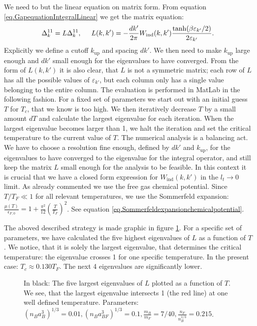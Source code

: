 We need to but the linear equation on matrix form. From equation \eqref{eq.GapequationIntegralLinear} we get the matrix equation:
\begin{equation}
\Delta^{11}_k = L \Delta^{11}_k, \hspace{0.5cm} L(k,k') = -\frac{dk'}{2\pi} W_{\text{ind}}(k,k')\frac{\tanh(\beta \varepsilon_{k'}/2)}{2\varepsilon_{k'}}. 
\label{eq.Gapmatrixequation}
\end{equation}
Explicitly we define a cutoff $k_{\text{up}}$ and spacing $dk'$. We then need to make $k_{\text{up}}$ large enough and $dk'$ small enough for the eigenvalues to have converged. From the form of $L(k,k')$ it is also clear, that $L$ is not a symmetric matrix; each row of $L$ has all the possible values of $\varepsilon_{k'}$, but each column only has a single value belonging to the entire column. The evaluation is performed in MatLab in the following fashion. For a fixed set of parameters we start out with an initial guess $T$ for $T_c$, that we know is too high. We then iteratively decrease $T$ by a small amount $dT$ and calculate the largest eigenvalue for each iteration. When the largest eigenvalue becomes larger than 1, we halt the iteration and set the critical temperature to the current value of $T$. The numerical analysis is a balancing act. We have to choose a resolution fine enough, defined by $dk'$ and $k_{\text{up}}$, for the eigenvalues to have converged to the eigenvalue for the integral operator, and still keep the matrix $L$ small enough for the analysis to be feasible. In this context it is crucial that we have a closed form expression for $W_{\text{ind}}(k,k')$ in the $l_t \to 0$ limit. As already commented we use the free gas chemical potential. Since $T/T_F \ll 1$ for all relevant temperatures, we use the Sommerfeld expansion: $\frac{\mu(T)}{\epsilon_{F,0}} = 1 + \frac{\pi^2}{12}\left(\frac{T}{T_F}\right)^2$. See equation \eqref{eq.Sommerfeldexpansionchemicalpotential}. 

The aboved described strategy is made graphic in figure \ref{fig.TCeigenvalues}. For a specific set of parameters, we have calculated the five highest eigenvalues of $L$ as a function of $T$. We notice, that it is solely the largest eigenvalue, that determines the critical temperature: the eigenvalue crosses 1 for one specific temperature. In the present case: $T_c \approx 0.130 T_F$. The next 4 eigenvalues are significantly lower. 

\begin{figure} 
\begin{center}  
  
\caption{In black: The five largest eigenvalues of $L$ plotted as a function of $T$. We see, that the largest eigenvalue intersects 1 (the red line) at one well defined temperature. Parameters: $(n_Ba_{B}^3)^{1/3} = 0.01, (n_Ba_{BF}^3)^{1/3} = 0.1, \frac{m_B}{m_F} = 7/40, \frac{n_F}{n_B^{1/3}} = 0.215$. }
\label{fig.TCeigenvalues}  
\end{center}    
\end{figure}

